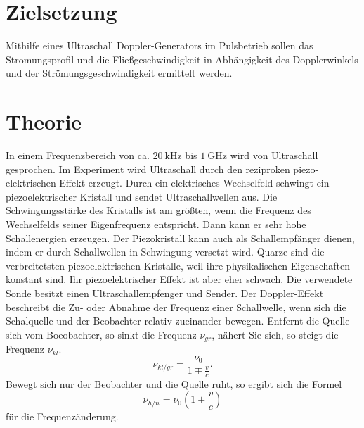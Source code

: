 \section{Zielsetzung}
\label{sec:Zielsetzung}

Mithilfe eines Ultraschall Doppler-Generators im Pulsbetrieb sollen das Stromungsprofil und die Fließgeschwindigkeit
in Abhängigkeit des Dopplerwinkels und der Strömungsgeschwindigkeit ermittelt werden.

\section{Theorie}
\label{sec:Theorie}

In einem Frequenzbereich von ca. $\SI{20}{\kilo\Hz}$ bis $\SI{1}{\giga\Hz}$ wird von Ultraschall gesprochen.
Im Experiment wird Ultraschall durch den reziproken piezo-elektrischen Effekt erzeugt. 
Durch ein elektrisches Wechselfeld schwingt ein piezoelektrischer Kristall und sendet Ultraschallwellen aus.
Die Schwingungsstärke des Kristalls ist am größten, wenn die Frequenz des Wechselfelds seiner Eigenfrequenz entspricht. 
Dann kann er sehr hohe Schallenergien erzeugen. Der Piezokristall kann auch als Schallempfänger dienen, 
indem er durch Schallwellen in Schwingung versetzt wird. Quarze sind die verbreitetsten piezoelektrischen Kristalle, 
weil ihre physikalischen Eigenschaften konstant sind. Ihr piezoelektrischer Effekt ist aber eher schwach.
Die verwendete Sonde besitzt einen Ultraschallempfenger und Sender.
Der Doppler-Effekt beschreibt die Zu- oder Abnahme der Frequenz einer Schallwelle, wenn sich die Schalquelle und 
der Beobachter relativ zueinander bewegen. 
Entfernt die Quelle sich vom Boeobachter, so sinkt die Frequenz $ν_{gr}$, nähert Sie sich, so steigt die Frequenz $ν_{kl}$.
\begin{equation}\label{eq:Doppler1}
    ν_{kl/gr} = \frac{ν_0}{1 \mp \frac{v}{c}}.%
\end{equation}
Bewegt sich nur der Beobachter und die Quelle ruht, so ergibt sich die Formel
\begin{equation}\label{eq:Doppler2}
    ν_{h/n} = ν_0 \left(1 \pm \frac{v}{c}\right)
\end{equation}
für die Frequenzänderung.\\

